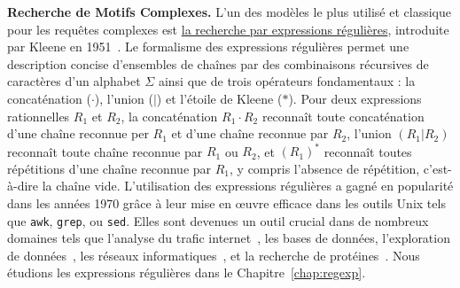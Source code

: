 \noindent\textbf{Recherche de Motifs Complexes.}
L'un des modèles le plus utilisé et classique pour les requêtes complexes est \underline{la recherche par expressions régulières}, introduite par Kleene en 1951~\cite{RM-704}.
Le formalisme des expressions régulières permet une description concise d'ensembles de chaînes par des combinaisons récursives de caractères d'un alphabet $\Sigma$ ainsi que de trois opérateurs fondamentaux : la concaténation ($\cdot$), l'union ($|$) et l'étoile de Kleene ($\ast$).
Pour deux expressions rationnelles $R_1$ et $R_2$, la concaténation $R_1\cdot R_2$ reconnaît toute concaténation d'une chaîne reconnue per $R_1$ et d'une chaîne reconnue par $R_2$, l'union $(R_1|R_2)$ reconnaît toute chaîne reconnue par $R_1$ ou $R_2$, et $(R_1)^\ast$ reconnaît toutes répétitions d'une chaîne reconnue par $R_1$, y compris l'absence de répétition, c'est-à-dire la chaîne vide.
L'utilisation des expressions régulières a gagné en popularité dans les années 1970 grâce à leur mise en œuvre efficace dans les outils Unix tels que \texttt{awk}, \texttt{grep}, ou \texttt{sed}.
Elles sont devenues un outil crucial dans de nombreux domaines tels que l'analyse du trafic internet~\cite{4221791,4579527}, les bases de données, l'exploration de données~\cite{1000341,10.5555/645927.672035,10.1145/375551.375569}, les réseaux informatiques~\cite{10.1145/1159913.1159952}, et la recherche de protéines~\cite{10.1145/369133.369220}.
%
Nous étudions les expressions régulières dans le Chapitre~\ref*{chap:regexp}.

